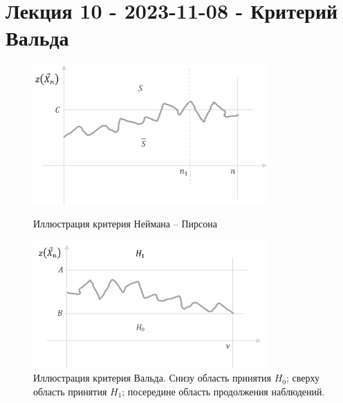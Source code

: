 
\section{Лекция 10 - 2023-11-08 - Критерий Вальда}

\begin{figure}[h!]
  \centering
  \begin{minipage}{0.45\textwidth}
    \centering
    \includegraphics[width=0.8\textwidth]{Figures/10-plot1.png}
    \caption{Иллюстрация критерия Неймана -- Пирсона}
    \label{fig:10-plot1}
  \end{minipage}\hfill
  \begin{minipage}{0.45\textwidth}
    \centering
    \includegraphics[width=0.8\textwidth]{Figures/10-plot2.png}
    \caption{Иллюстрация критерия Вальда. Снизу область принятия $H_0$;
      сверху область принятия $H_1$;
    посередине область продолжения наблюдений.}
    \label{fig:10-plot2}
  \end{minipage}
\end{figure}

